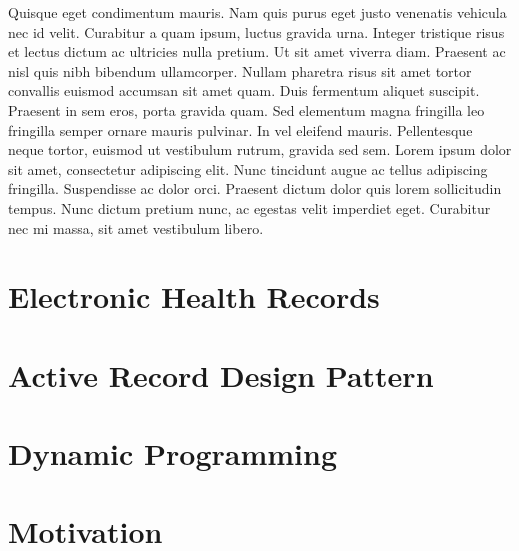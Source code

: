 \documentclass[botnum,fleqn,final]{unmeethesis}
\begin{document}
Quisque eget condimentum mauris. Nam quis purus eget justo venenatis vehicula
nec id velit. Curabitur a quam ipsum, luctus gravida urna. Integer tristique
risus et lectus dictum ac ultricies nulla pretium. Ut sit amet viverra diam.
Praesent ac nisl quis nibh bibendum ullamcorper. Nullam pharetra risus sit amet
tortor convallis euismod accumsan sit amet quam. Duis fermentum aliquet
suscipit. Praesent in sem eros, porta gravida quam. Sed elementum magna
fringilla leo fringilla semper ornare mauris pulvinar. In vel eleifend mauris.
Pellentesque neque tortor, euismod ut vestibulum rutrum, gravida sed sem. Lorem
ipsum dolor sit amet, consectetur adipiscing elit. Nunc tincidunt augue ac
tellus adipiscing fringilla. Suspendisse ac dolor orci. Praesent dictum dolor
quis lorem sollicitudin tempus. Nunc dictum pretium nunc, ac egestas velit
imperdiet eget. Curabitur nec mi massa, sit amet vestibulum libero.

\section{\label{section:intro:ehr}Electronic Health Records}

\section{\label{section:intro:ar}Active Record Design Pattern}

\section{\label{section:intro:dp}Dynamic Programming}

\section{\label{section:intro:mot}Motivation}
\end{document}
